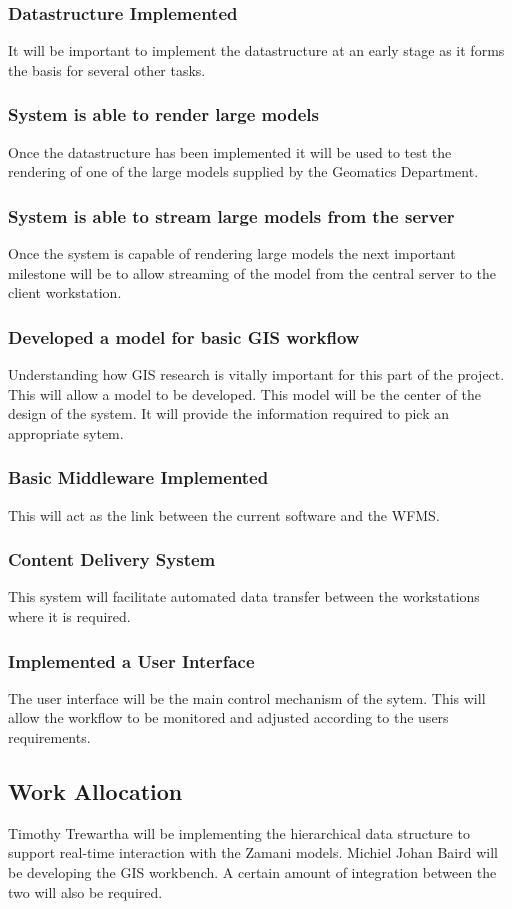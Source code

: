 \documentclass[12pt,a4paper]{article}
\begin{document}
\subsubsection*{Datastructure Implemented}
It will be important to implement the datastructure at an early stage as it
forms the basis for several other tasks.
\subsubsection*{System is able to render large models}
Once the datastructure has been implemented it will be used to test the
rendering of one of the large models supplied by the Geomatics Department.
\subsubsection*{System is able to stream large models from the server}
Once the system is capable of rendering large models the next important
milestone will be to allow streaming of the model from the central server to
the client workstation.
\subsubsection*{Developed a model for basic GIS workflow}
Understanding how GIS research is vitally important for this part of
the project. This will allow a model to be developed. This model will
be the center of the design of the system. It will provide the
information required to pick an appropriate sytem.
\subsubsection*{Basic Middleware Implemented}
This will act as the link between the current software and the WFMS.
\subsubsection*{Content Delivery System}
This system will facilitate automated data transfer between the workstations
where it is required.
\subsubsection*{Implemented a User Interface}
The user interface will be the main control mechanism of the sytem. This
will allow the workflow to be monitored and adjusted according to the users
requirements.

\subsection{Work Allocation}
Timothy Trewartha will be implementing the hierarchical data structure to support
real-time interaction with the Zamani models. Michiel Johan Baird will be developing
the GIS workbench. A certain amount of integration between the two will also be required.






\end{document}
